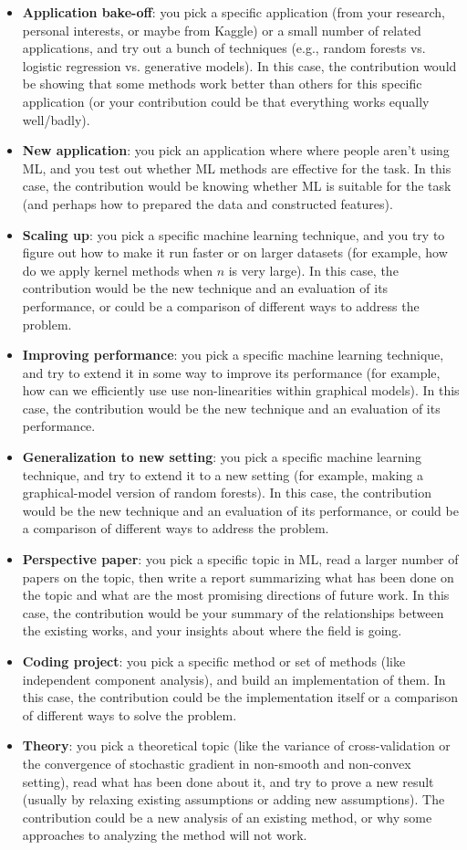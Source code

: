 \documentclass{article}
\def\items#1{\begin{itemize}#1\end{itemize}}
\begin{document}
\items{
\item \textbf{Application bake-off}: you pick a specific application (from your research, personal interests, or maybe from Kaggle) or a small number of related applications, and try out a bunch of techniques (e.g., random forests vs. logistic regression vs. generative models). In this case, the contribution would be showing that some methods work better than others for this specific application (or your contribution could be that everything works equally well/badly).
\item \textbf{New application}: you pick an application where where people aren't using ML, and you test out whether ML methods are effective for the task. In this case, the contribution would be knowing whether ML is suitable for the task (and perhaps how to prepared the data and constructed features).
\item \textbf{Scaling up}: you pick a specific machine learning technique, and you try to figure out how to make it run faster or on larger datasets (for example, how do we apply kernel methods when $n$ is very large). In this case, the contribution would be the new technique and an evaluation of its performance, or could be a comparison of different ways to address the problem.
\item \textbf{Improving performance}: you pick a specific machine learning technique, and try to extend it in some way to improve its performance (for example, how can we efficiently use use non-linearities within graphical models). In this case, the contribution would be the new technique and an evaluation of its performance.
\item \textbf{Generalization to new setting}: you pick a specific machine learning technique, and try to extend it to a new setting (for example, making a graphical-model version of random forests).  In this case, the contribution would be the new technique and an evaluation of its performance, or could be a comparison of different ways to address the problem.
\item \textbf{Perspective paper}: you pick a specific topic in ML, read a larger number of papers on the topic, then write a report summarizing what has been done on the topic and what are the most promising directions of future work. In this case, the contribution would be your summary of the relationships between the existing works, and your insights about where the field is going.
\item \textbf{Coding project}: you pick a specific method or set of methods (like independent component analysis), and build an implementation of them. In this case, the contribution could be the implementation itself or a comparison of different ways to solve the problem.
\item \textbf{Theory}: you pick a theoretical topic (like the variance of cross-validation or the convergence of stochastic gradient in non-smooth and non-convex setting), read what has been done about it, and try to prove a new result (usually by relaxing existing assumptions or adding new assumptions). The contribution could be a new analysis of an existing method, or why some approaches to analyzing the method will not work.
}
\end{document}
